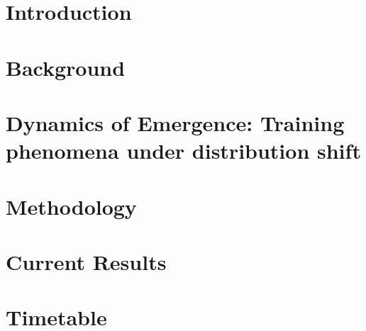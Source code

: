 \documentclass[ppgc,prop-tese,english]{iiufrgs}
\begin{document}
\chapter{Introduction}
    \label{chpt:intro}
    
    
%     

\chapter{Background}
    \label{chpt:background}
    

\chapter{Dynamics of Emergence: Training phenomena under distribution shift}%
    \label{chpt:learning_phenomena}
    

\chapter{Methodology}
    \label{chpt:circuitry}
    

\chapter{Current Results}
    \label{chpt:constrained_generation}
    


\chapter{Timetable}
    \label{chpt:reasoning}
    
\end{document}
